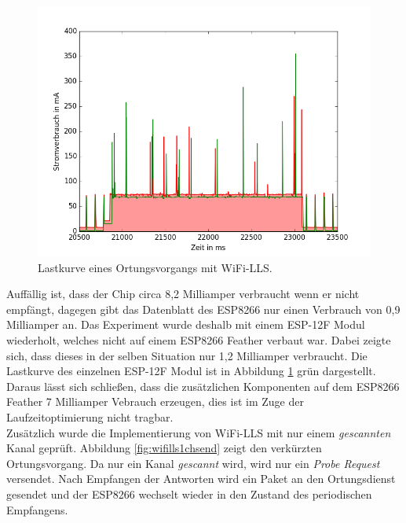 \begin{figure}[h!]
  \centering
	\includegraphics[width=\textwidth]{plots/wifillssendv.png}
  \caption{Lastkurve eines Ortungsvorgangs mit WiFi-LLS.}
  \label{fig:wifillssendv}
\end{figure}

Auffällig ist, dass der Chip circa 8,2 Milliamper verbraucht wenn er nicht empfängt, dagegen gibt das Datenblatt des ESP8266 nur einen Verbrauch von 0,9 Milliamper an.
Das Experiment wurde deshalb mit einem ESP-12F Modul wiederholt, welches nicht auf einem ESP8266 Feather verbaut war. 
Dabei zeigte sich, dass dieses in der selben Situation nur 1,2 Milliamper verbraucht.
Die Lastkurve des einzelnen ESP-12F Modul ist in Abbildung \ref{fig:wifillssendv} grün dargestellt.
Daraus lässt sich schließen, dass die zusätzlichen Komponenten auf dem ESP8266 Feather 7 Milliamper Vebrauch erzeugen, dies ist im Zuge der Laufzeitoptimierung nicht tragbar.\\
Zusätzlich wurde die Implementierung von WiFi-LLS mit nur einem \emph{gescannten} Kanal geprüft.
Abbildung \ref{fig:wifills1chsend} zeigt den verkürzten Ortungsvorgang.
Da nur ein Kanal \emph{gescannt} wird, wird nur ein \emph{Probe Request} versendet.
Nach Empfangen der Antworten wird ein Paket an den Ortungsdienst gesendet und der ESP8266 wechselt wieder in den Zustand des periodischen Empfangens.\\

